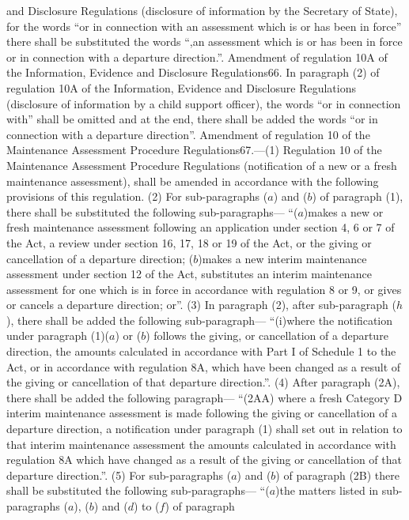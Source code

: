 \documentclass[a4paper]{article}
\begin{document}
and Disclosure Regulations (disclosure of information by the Secretary of
State), for the words “or in connection with an assessment which is or has been
in force” there shall be substituted the words “,an assessment which is or has
been in force or in connection with a departure direction.”.
Amendment of regulation 10A of the Information, Evidence and Disclosure
Regulations66. In paragraph (2) of regulation 10A of the Information, Evidence
and Disclosure Regulations (disclosure of information by a child support
officer), the words “or in connection with” shall be omitted and at the end,
there shall be added the words “or in connection with a departure direction”.
Amendment of regulation 10 of the Maintenance Assessment Procedure
Regulations67.—(1) Regulation 10 of the Maintenance Assessment Procedure
Regulations (notification of a new or a fresh maintenance assessment), shall be
amended in accordance with the following provisions of this regulation.
(2) For sub-paragraphs ($a$) and ($b$) of paragraph (1), there shall be substituted
the following sub-paragraphs—
“($a$)makes a new or fresh maintenance assessment following an application under
section 4, 6 or 7 of the Act, a review under section 16, 17, 18 or 19 of the
Act, or the giving or cancellation of a departure direction;
($b$)makes a new interim maintenance assessment under section 12 of the Act,
substitutes an interim maintenance assessment for one which is in force in
accordance with regulation 8 or 9, or gives or cancels a departure direction;
or”.
(3) In paragraph (2), after sub-paragraph ($h$), there shall be added the
following sub-paragraph—
“(i)where the notification under paragraph (1)($a$) or ($b$) follows the giving, or
cancellation of a departure direction, the amounts calculated in accordance with
Part I of Schedule 1 to the Act, or in accordance with regulation 8A, which have
been changed as a result of the giving or cancellation of that departure
direction.”.
(4) After paragraph (2A), there shall be added the following paragraph—
“(2AA) where a fresh Category D interim maintenance assessment is made following
the giving or cancellation of a departure direction, a notification under
paragraph (1) shall set out in relation to that interim maintenance assessment
the amounts calculated in accordance with regulation 8A which have changed as a
result of the giving or cancellation of that departure direction.”.
(5) For sub-paragraphs ($a$) and ($b$) of paragraph (2B) there shall be substituted
the following sub-paragraphs—
“($a$)the matters listed in sub-paragraphs ($a$), ($b$) and ($d$) to ($f$) of paragraph
\end{document}
